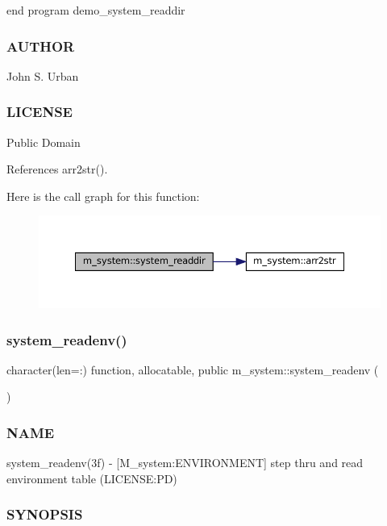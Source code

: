 end program demo\+\_\+system\+\_\+readdir

\subsubsection*{A\+U\+T\+H\+OR}

John S. Urban \subsubsection*{L\+I\+C\+E\+N\+SE}

Public Domain 

References arr2str().

Here is the call graph for this function\+:
\nopagebreak
\begin{figure}[H]
\begin{center}
\leavevmode
\includegraphics[width=350pt]{namespacem__system_a983df5b2d7cb5842d69c4a31829403e0_cgraph}
\end{center}
\end{figure}
\mbox{\label{namespacem__system_ae0e43010a82a6a25402568ccb326322d}} 
\subsubsection{\texorpdfstring{system\+\_\+readenv()}{system\_readenv()}}
{\footnotesize\ttfamily character(len=\+:) function, allocatable, public m\+\_\+system\+::system\+\_\+readenv (\begin{DoxyParamCaption}{ }\end{DoxyParamCaption})}



\subsubsection*{N\+A\+ME}

system\+\_\+readenv(3f) -\/ \mbox{[}M\+\_\+system\+:E\+N\+V\+I\+R\+O\+N\+M\+E\+NT\mbox{]} step thru and read environment table (L\+I\+C\+E\+N\+SE\+:PD) \subsubsection*{S\+Y\+N\+O\+P\+S\+IS}


